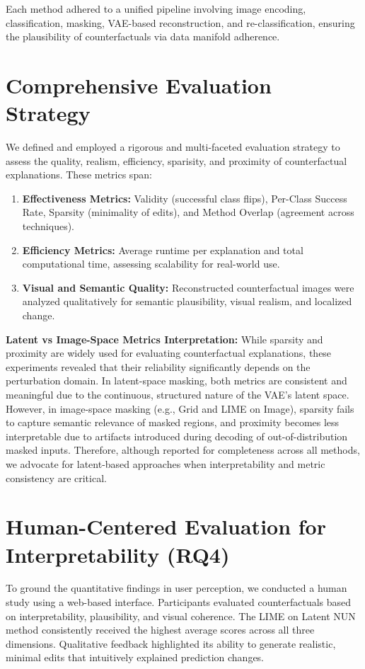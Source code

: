 Each method adhered to a unified pipeline involving image encoding, classification, masking, VAE-based reconstruction, and re-classification, ensuring the plausibility of counterfactuals via data manifold adherence.

\section{Comprehensive Evaluation Strategy}

We defined and employed a rigorous and multi-faceted evaluation strategy to assess the quality, realism, efficiency, sparisity, and proximity of counterfactual explanations. These metrics span:
\begin{enumerate}
    \item  \textbf{Effectiveness Metrics:} Validity (successful class flips), Per-Class Success Rate, Sparsity (minimality of edits), and Method Overlap (agreement across techniques).
    \item \textbf{Efficiency Metrics:} Average runtime per explanation and total computational time, assessing scalability for real-world use.
    \item \textbf{Visual and Semantic Quality:} Reconstructed counterfactual images were analyzed qualitatively for semantic plausibility, visual realism, and localized change.
\end{enumerate}

\textbf{Latent vs Image-Space Metrics Interpretation:}
While sparsity and proximity are widely used for evaluating counterfactual explanations, these experiments revealed that their reliability significantly depends on the perturbation domain. In latent-space masking, both metrics are consistent and meaningful due to the continuous, structured nature of the VAE’s latent space. However, in image-space masking (e.g., Grid and LIME on Image), sparsity fails to capture semantic relevance of masked regions, and proximity becomes less interpretable due to artifacts introduced during decoding of out-of-distribution masked inputs. Therefore, although reported for completeness across all methods, we advocate for latent-based approaches when interpretability and metric consistency are critical.




\section{Human-Centered Evaluation for Interpretability (RQ4)}
To ground the quantitative findings in user perception, we conducted a human study using a web-based interface. Participants evaluated counterfactuals based on interpretability, plausibility, and visual coherence. The LIME on Latent NUN method consistently received the highest average scores across all three dimensions. Qualitative feedback highlighted its ability to generate realistic, minimal edits that intuitively explained prediction changes.

